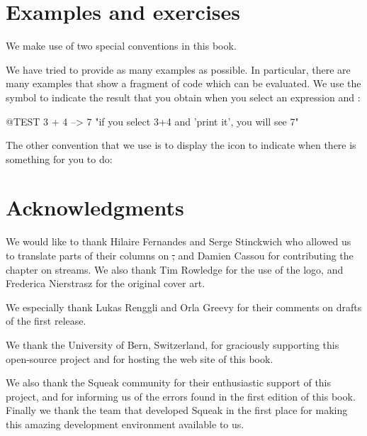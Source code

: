 \documentclass[a4paper,10pt,twoside]{book}
\begin{document}
\section*{Examples and exercises}

We make use of two special conventions in this book.

We have tried to provide as many examples as possible.
In particular, there are many examples that show a fragment of code which can be evaluated.  We use the symbol \ct{-->} to indicate the result that you obtain when you select an expression and :

\begin{code}{@TEST}
3 + 4 --> 7    "if you select 3+4 and 'print it', you will see 7"
\end{code}


The other convention that we use is to display the icon \dothisicon{} to indicate when there is something for you to do:


\section*{Acknowledgments}

We would like to thank Hilaire Fernandes and Serge Stinckwich who allowed us to translate parts of their columns on \st, and Damien Cassou for contributing the chapter on streams.
We also thank Tim Rowledge for the use of the \sq logo, and Frederica Nierstrasz for the original cover art.

We especially thank Lukas Renggli and Orla Greevy for their comments on drafts of the first release.

We thank the University of Bern, Switzerland, for graciously supporting this open-source project and for hosting the web site of this book.

We also thank the Squeak community for their enthusiastic support of this project, and for informing us of the errors found in the first edition of this book.
Finally we thank the team that developed Squeak in the first place for making this amazing development environment available to us.

\ifx\wholebook\relax\else
   
   
\end{document}
